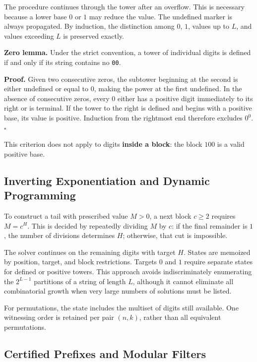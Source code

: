 \documentclass[11pt,a4paper]{article}
\begin{document}
The procedure continues through the tower after an overflow. This is necessary because a lower base $0$ or $1$ may reduce the value. The undefined marker is always propagated. By induction, the distinction among $0$, $1$, values up to $L$, and values exceeding $L$ is preserved exactly.

\textbf{Zero lemma.} Under the strict convention, a tower of individual digits is defined if and only if its string contains no \texttt{00}.

\textbf{Proof.} Given two consecutive zeros, the subtower beginning at the second is either undefined or equal to $0$, making the power at the first undefined. In the absence of consecutive zeros, every $0$ either has a positive digit immediately to its right or is terminal. If the tower to the right is defined and begins with a positive base, its value is positive. Induction from the rightmost end therefore excludes $0^0$. $\square$

This criterion does not apply to digits \textbf{inside a block}: the block $100$ is a valid positive base.

\subsection{Inverting Exponentiation and Dynamic Programming}

To construct a tail with prescribed value $M>0$, a next block $c\geq2$ requires $M=c^H$. This is decided by repeatedly dividing $M$ by $c$: if the final remainder is $1$, the number of divisions determines $H$; otherwise, that cut is impossible.

The solver continues on the remaining digits with target $H$. States are memoized by position, target, and block restrictions. Targets $0$ and $1$ require separate states for defined or positive towers. This approach avoids indiscriminately enumerating the $2^{L-1}$ partitions of a string of length $L$, although it cannot eliminate all combinatorial growth when very large numbers of solutions must be listed.

For permutations, the state includes the multiset of digits still available. One witnessing order is retained per pair $(n,k)$, rather than all equivalent permutations.

\subsection{Certified Prefixes and Modular Filters}
\end{document}
